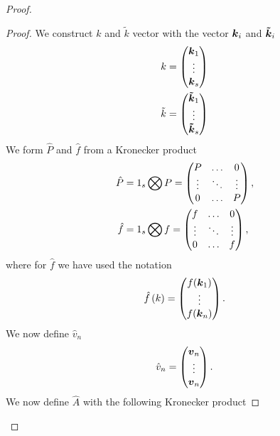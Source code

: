\begin{proof}
\begin{proof}
We construct $k$ and $\tilde{k}$ vector with the vector ${\boldsymbol {k}}_{i}$ and ${\boldsymbol {\tilde{k}}}_{i}$
\begin{align}
k&=\begin{pmatrix}
    {\boldsymbol {k}}_{1}\\
    \vdots\\
    {\boldsymbol {k}}_{s}\\
  \end{pmatrix}\\
\tilde{k}&=\begin{pmatrix}
    {\boldsymbol {\tilde{k}}}_{1}\\
    \vdots\\
    {\boldsymbol {\tilde{k}}}_{s}\\
  \end{pmatrix}
\end{align}
We form $\hat{P}$ and $\hat{f}$ from a Kronecker product
\begin{align}
\hat{P}&=1_{s}\bigotimes P=\begin{pmatrix}P	&\ldots	&0\\
			\vdots &\ddots 	&\vdots\\
			0	&\ldots		&P\\
	\end{pmatrix},\\
\hat{f}&=1_{s}\bigotimes f=\begin{pmatrix}f	&\ldots	&0\\
			\vdots &\ddots 	&\vdots\\
			0	&\ldots	&f\\
	\end{pmatrix},
\end{align}
where for $\hat{f}$ we have used the notation
\begin{equation}
 \hat{f}\left(k\right)=\begin{pmatrix}f({\boldsymbol {k}}_1)\\
			\vdots\\
			f({\boldsymbol {k}}_n)\\
	\end{pmatrix}.
\end{equation}
We now define $\hat{v}_n$
\begin{equation}
\hat{v}_{n}=\begin{pmatrix}
	      {\boldsymbol {v}}_{n}\\
	      \vdots\\
	      {\boldsymbol {v}}_{n}
	      \end{pmatrix}.
\end{equation}
We now define $\hat{A}$ with the following Kronecker product

\end{proof}
\end{proof}

